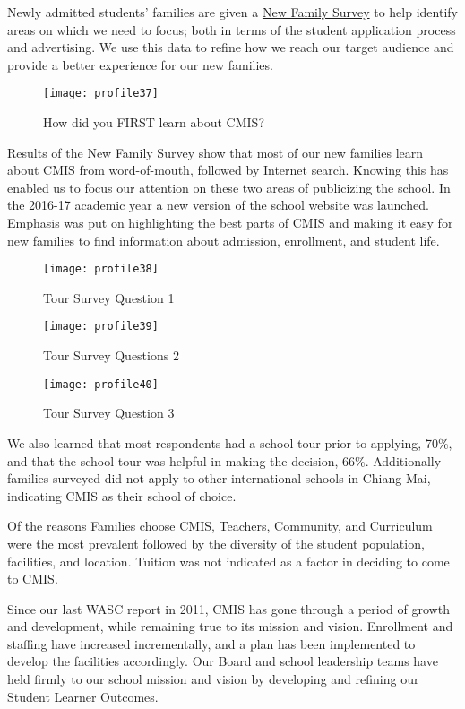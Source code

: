 Newly admitted students’ families are given a \href{https://docs.google.com/a/cmis.ac.th/forms/d/1basukpCBjcCMWXDh-cUUWW6lgk6zxYadGMn1EzFDQwc/viewanalytics}{New Family Survey} to help identify areas on which we need to focus; both in terms of the student application process and advertising. We use this data to refine how we reach our target audience and provide a better experience for our new families.

\begin{figure}
\centering
\texttt{[image: profile37]}
\caption{How did you FIRST learn about CMIS?}
\end{figure}

Results of the New Family Survey show that most of our new families learn about CMIS from word-of-mouth, followed by Internet search. Knowing this has enabled us to focus our attention on these two areas of publicizing the school. In the 2016-17 academic year a new version of the school website was launched. Emphasis was put on highlighting the best parts of CMIS and making it easy for new families to find information about admission, enrollment, and student life.

\begin{figure}
\centering
\texttt{[image: profile38]}
\caption{Tour Survey Question 1}
\end{figure}

\begin{figure}
\centering
\texttt{[image: profile39]}
\caption{Tour Survey Questions 2}
\end{figure}

\begin{figure}
\centering
\texttt{[image: profile40]}
\caption{Tour Survey Question 3}
\end{figure}

We also learned that most respondents had a school tour prior to applying, 70\%, and that the school tour was helpful in making the decision, 66\%. Additionally families surveyed did not apply to other international schools in Chiang Mai, indicating CMIS as their school of choice.

Of the reasons Families choose CMIS, Teachers, Community, and Curriculum were the most prevalent followed by the diversity of the student population, facilities, and location. Tuition was not indicated as a factor in deciding to come to CMIS.


Since our last WASC report in 2011, CMIS has gone through a period of growth and development, while remaining true to its mission and vision. Enrollment and staffing have increased incrementally, and a plan has been implemented to develop the facilities accordingly. Our Board and school leadership teams have held firmly to our school mission and vision by developing and refining our Student Learner Outcomes. 

